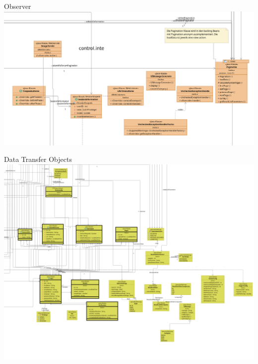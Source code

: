 \documentclass{beamer}
\begin{document}
    \begin{frame}{Observer}
        \centering
        \includegraphics[width=\textwidth]{../../docs/Entwurf/graphics/control_internal.png}
    \end{frame}

    \begin{frame}{Data Transfer Objects}
        \centering
        \includegraphics[width=\textwidth]{../../docs/Entwurf/graphics/global_transport.png}
    \end{frame}
\end{document}
